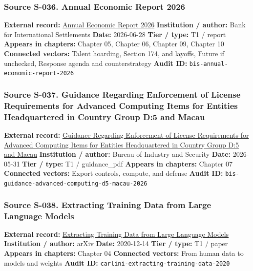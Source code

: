 \documentclass[
  american,
  11pt,
  letterpaper,
]{article}
\begin{document}
\subsubsection{Source S-036. Annual Economic Report
2026}\label{source-s-036-annual-economic-report-2026}

\textbf{External record:}
\href{https://www.bis.org/publ/arpdf/ar2026e.pdf}{Annual Economic Report
2026} \textbf{Institution / author:} Bank for International Settlements
\textbf{Date:} 2026-06-28 \textbf{Tier / type:} T1 / report
\textbf{Appears in chapters:} Chapter 05, Chapter 06, Chapter 09,
Chapter 10 \textbf{Connected vectors:} Talent hoarding, Section 174, and
layoffs, Future if unchecked, Response agenda and counterstrategy
\textbf{Audit ID:} \texttt{bis-annual-economic-report-2026}

\subsubsection{Source S-037. Guidance Regarding Enforcement of License
Requirements for Advanced Computing Items for Entities Headquartered in
Country Group D:5 and
Macau}\label{source-s-037-guidance-regarding-enforcement-of-license-requirements-for-advanced-computing-items-for-entities-headquartered-in-country-group-d-5-and-macau}

\textbf{External record:}
\href{https://www.bis.gov/media/documents/bis-guidance-may-31-2026.pdf}{Guidance
Regarding Enforcement of License Requirements for Advanced Computing
Items for Entities Headquartered in Country Group D:5 and Macau}
\textbf{Institution / author:} Bureau of Industry and Security
\textbf{Date:} 2026-05-31 \textbf{Tier / type:} T1 / guidance\_pdf
\textbf{Appears in chapters:} Chapter 07 \textbf{Connected vectors:}
Export controls, compute, and defense \textbf{Audit ID:}
\texttt{bis-guidance-advanced-computing-d5-macau-2026}

\subsubsection{Source S-038. Extracting Training Data from Large
Language
Models}\label{source-s-038-extracting-training-data-from-large-language-models}

\textbf{External record:}
\href{https://arxiv.org/abs/2012.07805}{Extracting Training Data from
Large Language Models} \textbf{Institution / author:} arXiv
\textbf{Date:} 2020-12-14 \textbf{Tier / type:} T1 / paper
\textbf{Appears in chapters:} Chapter 04 \textbf{Connected vectors:}
From human data to models and weights \textbf{Audit ID:}
\texttt{carlini-extracting-training-data-2020}
\end{document}
